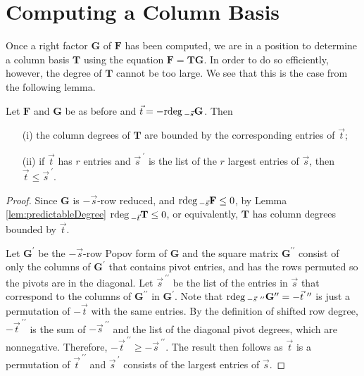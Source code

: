 
\section{Computing a Column Basis}

Once a right factor $\mathbf{G}$ of $\mathbf{F}$ has been computed,
we are in a position to determine a column basis $\mathbf{T}$ using
the equation $\mathbf{F}=\mathbf{T}\mathbf{G}$. In order to do so
efficiently, however, the degree of $\mathbf{T}$ cannot be too large.
We see that this is the case from the following lemma. 
\begin{lem}
\label{lem:colBasisdegreeBoundByRdegOfRightFactor} Let $\mathbf{F}$
and $\mathbf{G}$ be as before and $\vec{t}=-{\rm rdeg}\,_{-\vec{s}}\mathbf{G}$.
Then 
\begin{itemize}
\item[(i)] the column degrees of $\mathbf{T}$ are bounded by the corresponding
entries of $\vec{t}$; 
\item[(ii)] if $\vec{t}$ has $r$ entries and $\vec{s}^{~\prime}$ is the list
of the $r$ largest entries of $\vec{s}$, then $\vec{t}\le\vec{s}^{~\prime}$. 
\end{itemize}
\end{lem}
\begin{proof}
Since $\mathbf{G}$ is $-\vec{s}$-row reduced, and ${\rm rdeg}\,_{-\vec{s}}\mathbf{F}\le0$,
by Lemma \ref{lem:predictableDegree} ${\rm rdeg}\,_{-\vec{t}}\mathbf{T}\le0$,
or equivalently, $\mathbf{T}$ has column degrees bounded by $\vec{t}$.

Let $\mathbf{G}^{\prime}$ be the $-\vec{s}$-row Popov form of $\mathbf{G}$
and the square matrix $\mathbf{G}^{\prime\prime}$ consist of only
the columns of $\mathbf{G}^{\prime}$ that contains pivot entries,
and has the rows permuted so the pivots are in the diagonal. Let $\vec{s}^{~\prime\prime}$
be the list of the entries in $\vec{s}$ that correspond to the columns
of $\mathbf{G}^{\prime\prime}$ in $\mathbf{G}^{\prime}$. Note that
${\rm rdeg}\,_{-\vec{s}^{~\prime\prime}}\mathbf{G}^{\prime\prime}=-\vec{t}^{~\prime\prime}$
is just a permutation of $-\vec{t}$ with the same entries. By the
definition of shifted row degree, $-\vec{t}^{~\prime\prime}$ is the
sum of $-\vec{s}^{~\prime\prime}$ and the list of the diagonal pivot
degrees, which are nonnegative. Therefore, $-\vec{t}^{~\prime\prime}\ge-\vec{s}^{~\prime\prime}$.
The result then follows as $\vec{t}$ is a permutation of $\vec{t}^{~\prime\prime}$
and $\vec{s}^{\ \prime}$ consists of the largest entries of $\vec{s}$. 
\end{proof}
